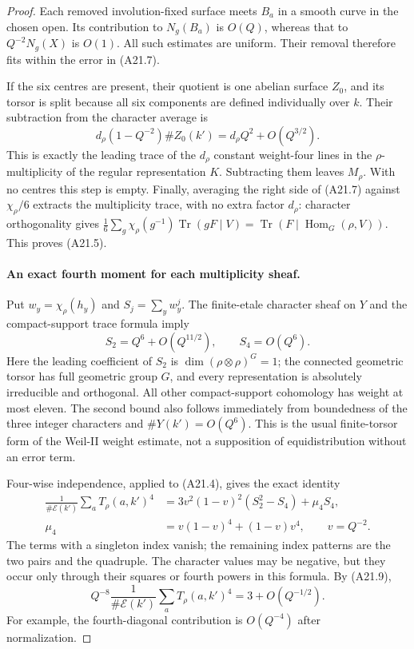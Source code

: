 \documentclass[11pt]{article}
\theoremstyle{remark}\newtheorem{remark}[theorem]{Remark}
\begin{document}
\begin{proof}
Each removed involution-fixed surface meets $B_a$ in a smooth curve in
the chosen open.  Its contribution to $N_g(B_a)$ is $O(Q)$, whereas that
to $Q^{-2}N_g(X)$ is $O(1)$.  All such estimates are uniform.  Their
removal therefore fits within the error in (A21.7).

If the six centres are present, their quotient is one abelian surface
$Z_0$, and its torsor is split because all six components are defined
individually over $k$.  Their subtraction from the character average is
\[
 d_\rho(1-Q^{-2})\#Z_0(k')
                         =d_\rho Q^2+O(Q^{3/2}).                 \tag{A21.8}
\]
This is exactly the leading trace of the $d_\rho$ constant weight-four
lines in the $\rho$-multiplicity of the regular representation $K$.
Subtracting them leaves $M_\rho$.  With no centres this step is empty.
Finally, averaging the right side of (A21.7) against $\chi_\rho/6$
extracts the multiplicity trace, with no extra factor $d_\rho$:
character orthogonality gives
$\frac16\sum_g\chi_\rho(g^{-1})\operatorname{Tr}(gF\mid V)
=\operatorname{Tr}(F\mid\operatorname{Hom}_G(\rho,V))$.
This proves (A21.5).

\paragraph{An exact fourth moment for each multiplicity sheaf.}
Put $w_y=\chi_\rho(h_y)$ and $S_j=\sum_yw_y^j$.  The finite-etale
character sheaf on $Y$ and the compact-support trace formula imply
\[
                        S_2=Q^6+O(Q^{11/2}),\qquad S_4=O(Q^6).
                                                                  \tag{A21.9}
\]
Here the leading coefficient of $S_2$ is
$\dim(\rho\otimes\rho)^G=1$; the connected geometric torsor has full
geometric group $G$, and every representation is absolutely irreducible
and orthogonal.  All other compact-support cohomology has weight at most
eleven.  The second bound also follows immediately from boundedness of
the three integer characters and $\#Y(k')=O(Q^6)$.  This is the usual
finite-torsor form of the Weil-II weight estimate, not a supposition of
equidistribution without an error term.

Four-wise independence, applied to (A21.4), gives the exact identity
\[
 \begin{split}
 \frac1{\#\mathcal E(k')}\sum_a T_\rho(a,k')^4
     &=3v^2(1-v)^2(S_2^2-S_4)+\mu_4S_4,\\
 \mu_4&=v(1-v)^4+(1-v)v^4,
 \qquad v=Q^{-2}.
 \end{split}                                                     \tag{A21.10}
\]
The terms with a singleton index vanish; the remaining index patterns
are the two pairs and the quadruple.  The character values may be
negative, but they occur only through their squares or fourth powers in
this formula.  By (A21.9),
\[
 Q^{-8}\frac1{\#\mathcal E(k')}\sum_aT_\rho(a,k')^4
                                  =3+O(Q^{-1/2}).                 \tag{A21.11}
\]
For example, the fourth-diagonal contribution is $O(Q^{-4})$ after
normalization.


\end{proof}
\end{document}
